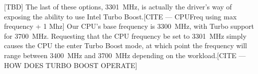 [TBD] The last of these options, 3301~MHz, is actually the driver's way of exposing
the ability to use Intel Turbo Boost.[CITE — CPUFreq using max frequency + 1 Mhz]
Our CPU's base frequency is 3300~MHz,
with Turbo support for 3700~MHz. Requesting that the CPU frequency be set to
3301~MHz simply causes the CPU the enter Turbo Boost mode, at which point the
frequency will range between 3400~MHz and 3700~MHz depending on the
workload.[CITE — HOW DOES TURBO BOOST OPERATE]
